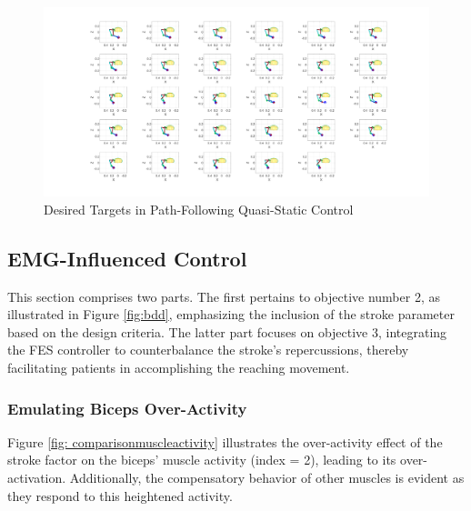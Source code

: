 \newpage
\begin{landscape} %
  \begin{figure}[h!]
    \centering
    \includegraphics[width=1.7\textwidth]{Pictures/Results/Controller/QSC29positions.png}
    \caption{Desired Targets in Path-Following Quasi-Static Control} 
    \label{fig:pqsc}
  \end{figure}
\end{landscape} %

\subsection{EMG-Influenced Control}

This section comprises two parts. The first pertains to objective number 2, as illustrated in Figure \ref{fig:bdd}, emphasizing the inclusion of the stroke parameter based on the design criteria. The latter part focuses on objective 3, integrating the FES controller to counterbalance the stroke's repercussions, thereby facilitating patients in accomplishing the reaching movement.

\subsubsection{Emulating Biceps Over-Activity}
Figure \ref{fig: comparisonmuscleactivity} illustrates the over-activity effect of the stroke factor on the biceps' muscle activity (index = 2), leading to its over-activation. Additionally, the compensatory behavior of other muscles is evident as they respond to this heightened activity.

